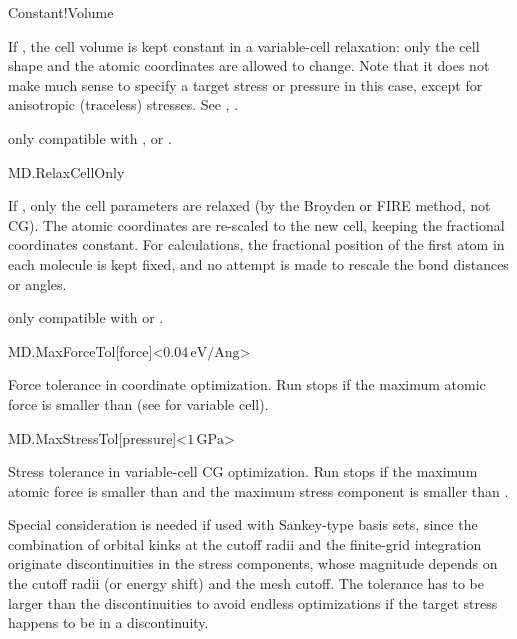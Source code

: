 \begin{fdflogicalF}{Constant!Volume}

  If \fdftrue, the cell volume is kept constant in a variable-cell
  relaxation: only the cell shape and the atomic coordinates are
  allowed to change.  Note that it does not make much sense to specify
  a target stress or pressure in this case, except for anisotropic
  (traceless) stresses.  See ,
  .

  \note only compatible with ,
   or .

\end{fdflogicalF}

\begin{fdflogicalF}{MD.RelaxCellOnly}

  If \fdftrue, only the cell parameters are relaxed (by the Broyden or
  FIRE method, not CG). The atomic coordinates are re-scaled to the
  new cell, keeping the fractional coordinates constant. For
   calculations, the fractional position of the first
  atom in each molecule is kept fixed, and no attempt is made to
  rescale the bond distances or angles.

  \note only compatible with  or .

\end{fdflogicalF}

\begin{fdfentry}{MD.MaxForceTol}[force]<$0.04\,\mathrm{eV/Ang}$>
  
  Force tolerance in coordinate optimization.
  Run stops if the maximum atomic force is
  smaller than  (see 
  for variable cell).

\end{fdfentry}

\begin{fdfentry}{MD.MaxStressTol}[pressure]<$1\,\mathrm{GPa}$>
  
  Stress tolerance in variable-cell CG optimization. Run stops if the
  maximum atomic force is smaller than  and the
  maximum stress component is smaller than .

  Special consideration is needed if used with Sankey-type basis sets,
  since the combination of orbital kinks at the cutoff radii and the
  finite-grid integration originate discontinuities in the stress
  components, whose magnitude depends on the cutoff radii (or energy
  shift) and the mesh cutoff. The tolerance has to be larger than the
  discontinuities to avoid endless optimizations if the target stress
  happens to be in a discontinuity.

\end{fdfentry}

